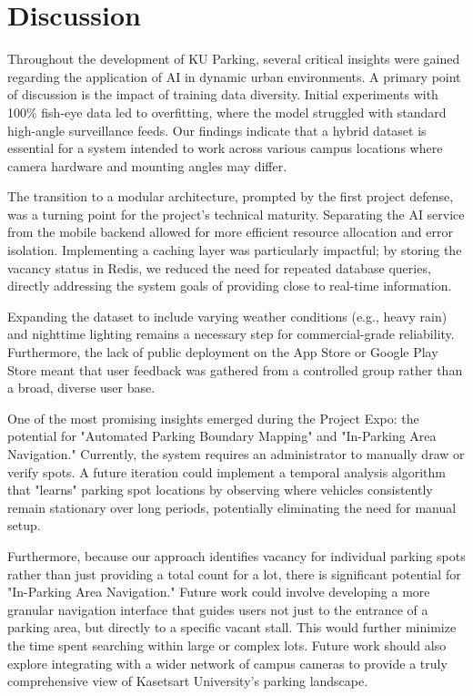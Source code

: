 \section{Discussion}
\label{section:discussion}
Throughout the development of KU Parking, several critical insights were gained regarding the application of AI in dynamic urban environments. A primary point of discussion is the impact of training data diversity. Initial experiments with 100\% fish-eye data led to overfitting, where the model struggled with standard high-angle surveillance feeds. Our findings indicate that a hybrid dataset is essential for a system intended to work across various campus locations where camera hardware and mounting angles may differ.

The transition to a modular architecture, prompted by the first project defense, was a turning point for the project's technical maturity. Separating the AI service from the mobile backend allowed for more efficient resource allocation and error isolation. Implementing a caching layer was particularly impactful; by storing the vacancy status in Redis, we reduced the need for repeated database queries, directly addressing the system goals of providing close to real-time information.

Expanding the dataset to include varying weather conditions (e.g., heavy rain) and nighttime lighting remains a necessary step for commercial-grade reliability. Furthermore, the lack of public deployment on the App Store or Google Play Store meant that user feedback was gathered from a controlled group rather than a broad, diverse user base.

One of the most promising insights emerged during the Project Expo: the potential for "Automated Parking Boundary Mapping" and "In-Parking Area Navigation." Currently, the system requires an administrator to manually draw or verify spots. A future iteration could implement a temporal analysis algorithm that "learns" parking spot locations by observing where vehicles consistently remain stationary over long periods, potentially eliminating the need for manual setup.

Furthermore, because our approach identifies vacancy for individual parking spots rather than just providing a total count for a lot, there is significant potential for "In-Parking Area Navigation." Future work could involve developing a more granular navigation interface that guides users not just to the entrance of a parking area, but directly to a specific vacant stall. This would further minimize the time spent searching within large or complex lots. Future work should also explore integrating with a wider network of campus cameras to provide a truly comprehensive view of Kasetsart University's parking landscape.